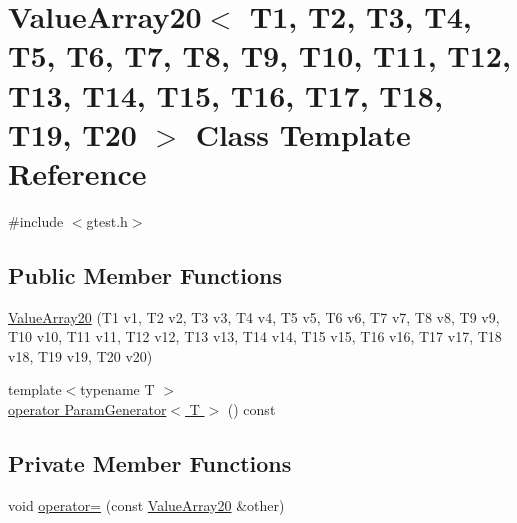 \hypertarget{classtesting_1_1internal_1_1ValueArray20}{\section{\-Value\-Array20$<$ \-T1, \-T2, \-T3, \-T4, \-T5, \-T6, \-T7, \-T8, \-T9, \-T10, \-T11, \-T12, \-T13, \-T14, \-T15, \-T16, \-T17, \-T18, \-T19, \-T20 $>$ \-Class \-Template \-Reference}
\label{da/d93/classtesting_1_1internal_1_1ValueArray20}
}


{\ttfamily \#include $<$gtest.\-h$>$}

\subsection*{\-Public \-Member \-Functions}
\begin{DoxyCompactItemize}
\item 
\hyperlink{classtesting_1_1internal_1_1ValueArray20_a8c9dfd738ed800e15aedb694ef3c23c0}{\-Value\-Array20} (\-T1 v1, \-T2 v2, \-T3 v3, \-T4 v4, \-T5 v5, \-T6 v6, \-T7 v7, \-T8 v8, \-T9 v9, \-T10 v10, \-T11 v11, \-T12 v12, \-T13 v13, \-T14 v14, \-T15 v15, \-T16 v16, \-T17 v17, \-T18 v18, \-T19 v19, \-T20 v20)
\item 
{\footnotesize template$<$typename T $>$ }\\\hyperlink{classtesting_1_1internal_1_1ValueArray20_a08ef46fa12c9dd8ef6fc630baeea89b7}{operator Param\-Generator$<$ T $>$} () const 
\end{DoxyCompactItemize}
\subsection*{\-Private \-Member \-Functions}
\begin{DoxyCompactItemize}
\item 
void \hyperlink{classtesting_1_1internal_1_1ValueArray20_a450bc99a7e84b9e8383c329d22b87b90}{operator=} (const \hyperlink{classtesting_1_1internal_1_1ValueArray20}{\-Value\-Array20} \&other)
\end{DoxyCompactItemize}
